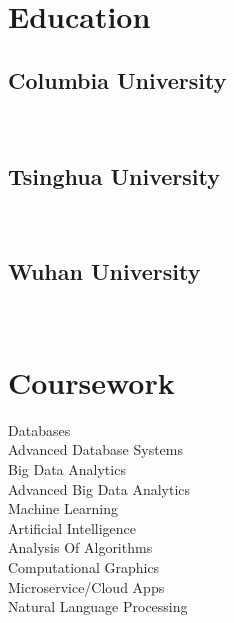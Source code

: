 \documentclass[]{junhu_resume}
\begin{document}
\begin{minipage}[t]{0.3\textwidth} 


\section{Education} 

\subsection{Columbia University}
\\
\sectionsep

\subsection{Tsinghua University}
\\
\sectionsep

\subsection{Wuhan University}
\\
\sectionsep



\section{Coursework}
Databases\\
Advanced Database Systems\\
Big Data Analytics\\
Advanced Big Data Analytics\\
Machine Learning\\
Artificial Intelligence\\
Analysis Of Algorithms\\
Computational Graphics\\
Microservice/Cloud Apps\\
Natural Language Processing
\sectionsep




\end{minipage}
\end{document}
